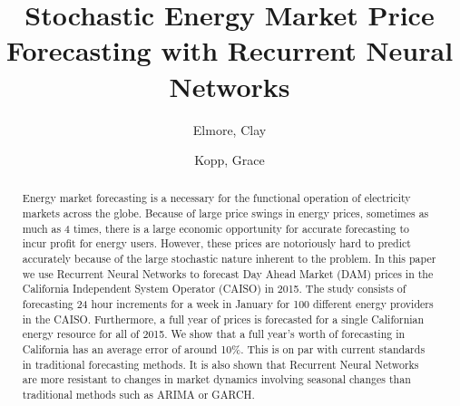 \documentclass[sigconf]{acmart}
\begin{document}
%

%
\title{Stochastic Energy Market Price Forecasting with Recurrent Neural Networks}

%

\author{Elmore, Clay}

\author{Kopp, Grace}
%
\renewcommand{\shortauthors}{Elmore and Kopp, et al.}


\begin{abstract}
Energy market forecasting is a necessary for the functional operation of electricity markets across the globe. Because of large price swings in energy prices, sometimes as much as 4 times, there is a large economic opportunity for accurate forecasting to incur profit for energy users. However, these prices are notoriously hard to predict accurately because of the large stochastic nature inherent to the problem. In this paper we use Recurrent Neural Networks to forecast Day Ahead Market (DAM) prices in the California Independent System Operator (CAISO) in 2015. The study consists of forecasting 24 hour increments for a week in January for 100 different energy providers in the CAISO. Furthermore, a full year of prices is forecasted for a single Californian energy resource for all of 2015. We show that a full year's worth of forecasting in California has an average error of around 10\%. This is on par with current standards in traditional forecasting methods. It is also shown that Recurrent Neural Networks are more resistant to changes in market dynamics involving seasonal changes than traditional methods such as ARIMA or GARCH. 
\end{abstract}
\end{document}
